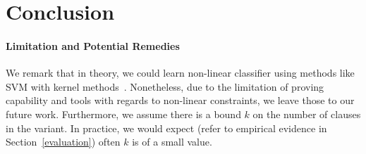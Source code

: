 
\section{Conclusion} \label{conclusion}


\paragraph{Limitation and Potential Remedies}
We remark that in theory, we could learn non-linear classifier using methods like SVM with kernel methods~\cite{}. Nonetheless, due to the limitation of proving capability and tools with regards to non-linear constraints, we leave those to our future work. Furthermore, we assume there is a bound $k$ on the number of clauses in the variant. In practice, we would expect (refer to empirical evidence in Section~\ref{evaluation}) often $k$ is of a small value.
